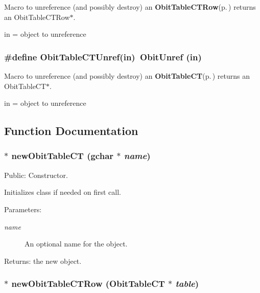 Macro to unreference (and possibly destroy) an {\bf Obit\-Table\-CTRow}{\rm (p.\,\pageref{structObitTableCTRow})} returns an Obit\-Table\-CTRow$\ast$. 

in = object to unreference 
\subsubsection{\setlength{\rightskip}{0pt plus 5cm}\#define Obit\-Table\-CTUnref(in)\ Obit\-Unref (in)}\label{ObitTableCT_8h_a1}


Macro to unreference (and possibly destroy) an {\bf Obit\-Table\-CT}{\rm (p.\,\pageref{structObitTableCT})} returns an Obit\-Table\-CT$\ast$. 

in = object to unreference 

\subsection{Function Documentation}
\subsubsection{$\ast$ new\-Obit\-Table\-CT (gchar $\ast$ {\em name})}\label{ObitTableCT_8h_a11}


Public: Constructor. 

Initializes class if needed on first call. \begin{Desc}
\item[Parameters:]
\begin{description}
\item[{\em name}]An optional name for the object. \end{description}
\end{Desc}
\begin{Desc}
\item[Returns:]the new object. \end{Desc}
\subsubsection{$\ast$ new\-Obit\-Table\-CTRow ({\bf Obit\-Table\-CT} $\ast$ {\em table})}\label{ObitTableCT_8h_a8}


